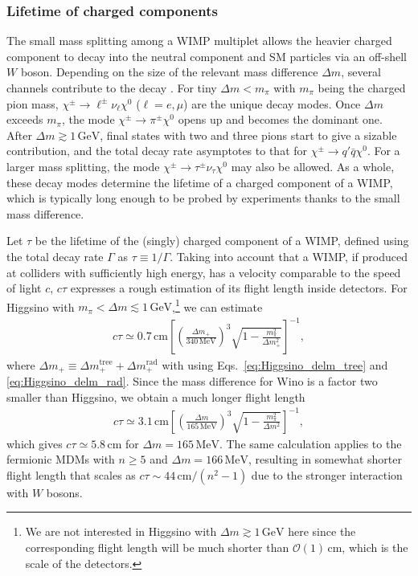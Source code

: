 \documentclass[12pt,twoside,book]{article}
\begin{document}
\subsubsection*{Lifetime of charged components}

The small mass splitting among a WIMP multiplet allows the heavier charged component to decay into the neutral component and SM particles via an off-shell $W$ boson.
Depending on the size of the relevant mass difference $\Delta m$, several channels contribute to the decay \cite{Chen:1995yu}.
For tiny $\Delta m < m_\pi$ with $m_\pi$ being the charged pion mass, $\chi^{\pm} \to \ell^{\pm} \nu_\ell \chi^0$ ($\ell = e, \mu$) are the unique decay modes.
Once $\Delta m$ exceeds $m_\pi$, the mode $\chi^{\pm} \to \pi^{\pm} \chi^0$ opens up and becomes the dominant one.
After $\Delta m \gtrsim 1\, \mathrm{GeV}$, final states with two and three pions start to give a sizable contribution, and the total decay rate asymptotes to that for $\chi^{\pm} \to q' \bar{q} \chi^0$.
For a larger mass splitting, the mode $\chi^{\pm} \to \tau^{\pm} \nu_\tau \chi^0$ may also be allowed.
As a whole, these decay modes determine the lifetime of a charged component of a WIMP, which is typically long enough to be probed by experiments thanks to the small mass difference.

Let $\tau$ be the lifetime of the (singly) charged component of a WIMP, defined using the total decay rate $\Gamma$ as $\tau \equiv 1/\Gamma$.
Taking into account that a WIMP, if produced at colliders with sufficiently high energy, has a velocity comparable to the speed of light $c$, $c \tau$ expresses a rough estimation of its flight length inside detectors.
For Higgsino with $m_\pi < \Delta m \lesssim 1\,\mathrm{GeV}$,\footnote
{
  We are not interested in Higgsino with $\Delta m \gtrsim 1\, \mathrm{GeV}$ here since the corresponding flight length will be much shorter than $\mathcal{O} (1)\, \mathrm{cm}$, which is the scale of the detectors.
}
we can estimate \cite{Chen:1995yu,Thomas:1998wy}
\begin{align}
  c \tau \simeq 0.7\, \mathrm{cm}
  \left[ \left( \frac{\Delta m_{+}}{340\,\mathrm{MeV}} \right)^3
  \sqrt{1 - \frac{m_\pi^2}{\Delta m_{+}^2}} \right]^{-1},
\end{align}
where $\Delta m_{+} \equiv \Delta m_{+}^{\mathrm{tree}} + \Delta m_{+}^{\mathrm{rad}}$ with using Eqs.~\eqref{eq:Higgsino_delm_tree} and \eqref{eq:Higgsino_delm_rad}.
Since the mass difference for Wino is a factor two smaller than Higgsino, we obtain a much longer flight length
\begin{align}
  c \tau \simeq 3.1\, \mathrm{cm} \left[
  \left( \frac{\Delta m}{165\, \mathrm{MeV}} \right)^3
  \sqrt{1 - \frac{m_\pi^2}{\Delta m^2}} \right]^{-1},
\end{align}
which gives $c\tau \simeq 5.8\,\mathrm{cm}$ for $\Delta m = 165\,\mathrm{MeV}$.
The same calculation applies to the fermionic MDMs with $n \geq 5$ and $\Delta m = 166\, \mathrm{MeV}$, resulting in somewhat shorter flight length that scales as $c \tau \sim 44\, \mathrm{cm} / (n^2 - 1)$ \cite{Cirelli:2005uq} due to the stronger interaction with $W$ bosons.
\end{document}
